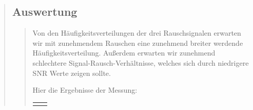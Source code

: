 \begin{quote}
\begin{quote}
        
    \end{quote}
    
    \subsection{Auswertung}
    \begin{quote}
        Von den Häufigkeitsverteilungen der drei Rauschsignalen erwarten wir mit zunehmendem Rauschen eine zunehmend
        breiter werdende Häufigkeitsverteilung. Außerdem erwarten wir zunehmend
        schlechtere Signal-Rausch-Verhältnisse, welches sich durch niedrigere SNR Werte zeigen sollte.\vspace{1em}
        
        Hier die Ergebnisse der Messung:
        
               \begin{center}
               \begin{tabular}{ll}
        
               \hspace{-4.5cm}
                   \begin{minipage}{0.6\textwidth}
        

\end{minipage}
\end{tabular}
\end{center}
\end{quote}
\end{quote}
